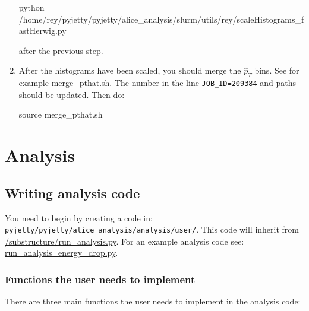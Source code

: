 \documentclass[12pt]{article}
\begin{document}
\begin{enumerate}
\begin{tcolorbox}
\begin{verbnobox}[\scriptsize]
python /home/rey/pyjetty/pyjetty/alice_analysis/slurm/utils/rey/scaleHistograms_fastHerwig.py
\end{verbnobox}  
\end{tcolorbox}

after the previous step.

\item After the histograms have been scaled, you should merge the $\hat{p}_T$ bins. See for example \href{https://github.com/reynier0611/pyjetty/blob/master/pyjetty/alice_analysis/slurm/utils/rey/merge_pthat.sh}{merge\_pthat.sh}.
The number in the line \verb|JOB_ID=209384| and paths should be updated. Then do:

\begin{tcolorbox}
\begin{verbnobox}[\scriptsize]
source merge_pthat.sh
\end{verbnobox}  
\end{tcolorbox}

\end{enumerate}

\section{Analysis}

\subsection{Writing analysis code}

You need to begin by creating a code in: \verb|pyjetty/pyjetty/alice_analysis/analysis/user/|.
This code will inherit from
\href{https://github.com/reynier0611/pyjetty/blob/master/pyjetty/alice_analysis/analysis/user/substructure/run_analysis.py}{/substructure/run\_analysis.py}.
For an example analysis code see: \href{https://github.com/reynier0611/pyjetty/blob/master/pyjetty/alice_analysis/analysis/user/rey/run_analysis_energy_drop.py}{run\_analysis\_energy\_drop.py}.

\subsubsection{Functions the user needs to implement}

There are three main functions the user needs to implement in the analysis code:
\end{document}
